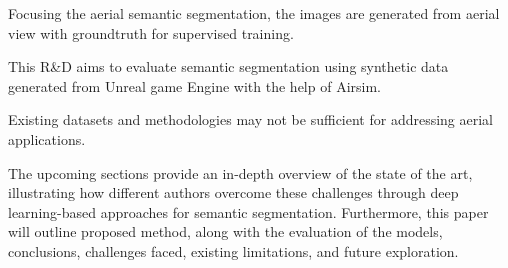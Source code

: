 \documentclass[../report.tex]{subfiles}
\begin{document}
    Focusing the aerial semantic segmentation, the images are generated from aerial view with groundtruth for supervised training. 

    This R\&D aims to evaluate semantic segmentation using synthetic data generated from Unreal game Engine with the help of Airsim.

    Existing datasets and methodologies may not be sufficient for addressing aerial applications. 
    
    The upcoming sections provide an in-depth overview of the state of the art, illustrating how different authors overcome these challenges through deep learning-based approaches for semantic segmentation. Furthermore, this paper will outline proposed method, along with the evaluation of the models, conclusions, challenges faced, existing limitations, and future exploration.

    

    

    
    
\end{document}
